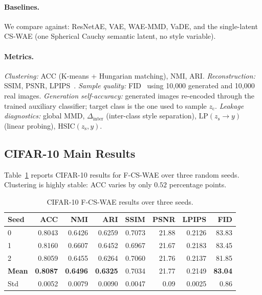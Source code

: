 \documentclass[10pt]{article}
\newcommand{\ours}{F-CS-WAE}
\newcommand{\simple}{CS-WAE}
\newcommand{\zc}{z_{\mathrm{c}}}
\newcommand{\zs}{z_{\mathrm{s}}}
\newcommand{\HSIC}{\mathrm{HSIC}}
\begin{document}
\paragraph{Baselines.}
We compare against: ResNetAE, VAE, WAE-MMD, VaDE, and the single-latent \simple{}
(one Spherical Cauchy semantic latent, no style variable).

\paragraph{Metrics.}
\emph{Clustering:} ACC (K-means + Hungarian matching), NMI, ARI.
\emph{Reconstruction:} SSIM, PSNR, LPIPS~\citep{zhang2018unreasonable}.
\emph{Sample quality:} FID~\citep{heusel2017gans} using 10{,}000 generated and
10{,}000 real images.
\emph{Generation self-accuracy:} generated images re-encoded through the trained
auxiliary classifier; target class is the one used to sample $\zc$.
\emph{Leakage diagnostics:} global MMD, $\Delta_{\mathrm{inter}}$ (inter-class
style separation), $\mathrm{LP}(\zs\to y)$ (linear probing), $\HSIC(\zs,y)$.

\subsection{CIFAR-10 Main Results}
\label{sec:cifar10}

Table~\ref{tab:cifar-main} reports CIFAR-10 results for \ours{} over three random seeds.
Clustering is highly stable: ACC varies by only $0.52$ percentage points.

\begin{table}[t]
\centering
\caption{CIFAR-10 \ours{} results over three seeds.}
\label{tab:cifar-main}
\begin{tabular}{lrrrrrrr}
\toprule
Seed & ACC & NMI & ARI & SSIM & PSNR & LPIPS & FID \\
\midrule
0 & 0.8043 & 0.6426 & 0.6259 & 0.7073 & 21.88 & 0.2126 & 83.83 \\
1 & 0.8160 & 0.6607 & 0.6452 & 0.6967 & 21.67 & 0.2183 & 83.45 \\
2 & 0.8059 & 0.6455 & 0.6264 & 0.7060 & 21.76 & 0.2137 & 81.85 \\
\midrule
\textbf{Mean} & \textbf{0.8087} & \textbf{0.6496} & \textbf{0.6325}
              & 0.7034 & 21.77 & 0.2149 & \textbf{83.04} \\
Std           & 0.0052 & 0.0079 & 0.0090 & 0.0047 & 0.09 & 0.0025 & 0.86 \\
\bottomrule
\end{tabular}
\end{table}
\end{document}
